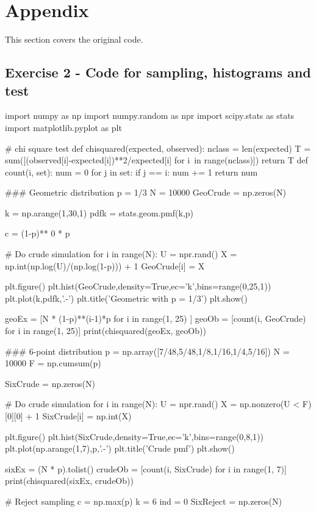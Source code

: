\newpage
\section*{Appendix}
This section covers the original code.


\subsection*{Exercise 2 - Code for sampling, histograms and test}
\begin{python}
import numpy as np
import numpy.random as npr
import scipy.stats as stats
import matplotlib.pyplot as plt

# chi square test
def chisquared(expected, observed):
    nclass = len(expected)
    T = sum([(observed[i]-expected[i])**2/expected[i] for i\
             in range(nclass)])
    return T
def count(i, set):
    num = 0
    for j in set:
        if j == i:
            num += 1
    return num


### Geometric distribution
p = 1/3
N = 10000
GeoCrude = np.zeros(N)

k = np.arange(1,30,1)
pdfk = stats.geom.pmf(k,p)

c = (1-p)** 0 * p

# Do crude simulation
for i in range(N):
    U = npr.rand()
    X = np.int(np.log(U)/(np.log(1-p))) + 1
    GeoCrude[i] = X

plt.figure()
plt.hist(GeoCrude,density=True,ec='k',bins=range(0,25,1))
plt.plot(k,pdfk,'.-')
plt.title('Geometric with p = 1/3')
plt.show()

geoEx = [N * (1-p)**(i-1)*p for i in range(1, 25) ]
geoOb = [count(i, GeoCrude) for i in range(1, 25)]
print(chisquared(geoEx, geoOb))


### 6-point distribution
p = np.array([7/48,5/48,1/8,1/16,1/4,5/16])
N = 10000
F = np.cumsum(p)

SixCrude = np.zeros(N)


# Do crude simulation
for i in range(N):
    U = npr.rand()
    X = np.nonzero(U < F)[0][0] + 1
    SixCrude[i] = np.int(X)

plt.figure()
plt.hist(SixCrude,density=True,ec='k',bins=range(0,8,1))
plt.plot(np.arange(1,7),p,'.-')
plt.title('Crude pmf')
plt.show()

sixEx = (N * p).tolist()
crudeOb = [count(i, SixCrude) for i in range(1, 7)]
print(chisquared(sixEx, crudeOb))

# Reject sampling
c = np.max(p)
k = 6
ind = 0
SixReject = np.zeros(N)



\end{python}
